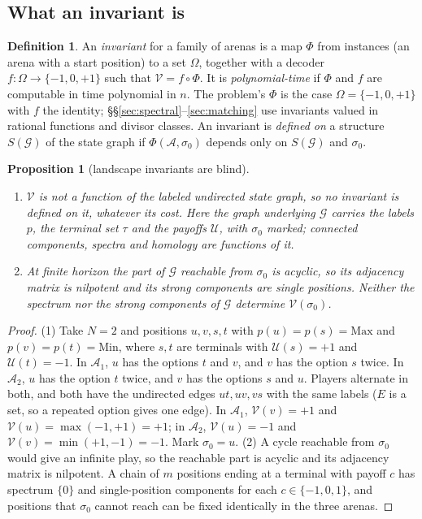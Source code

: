 \documentclass[11pt]{amsart}
\theoremstyle{plain}
\newtheorem{proposition}[theorem]{Proposition}
\theoremstyle{definition}
\newtheorem*{definition*}{Definition}
\theoremstyle{remark}
\numberwithin{equation}{section}
\newcommand{\val}{\mathcal{V}}            %
\newcommand{\pay}{\mathcal{U}}            %
\newcommand{\SG}{\mathcal{G}}             %
\newcommand{\arena}{\mathcal{A}}          %
\begin{document}
\subsection{What an invariant is}
\begin{definition*}
An \emph{invariant} for a family of arenas is a map $\Phi$ from instances (an arena with a start position) to a set $\Omega$, together with a decoder $f\colon\Omega\to\{-1,0,+1\}$ such that $\val=f\circ\Phi$. It is \emph{polynomial-time} if $\Phi$ and $f$ are computable in time polynomial in $n$. The problem's $\Phi$ is the case $\Omega=\{-1,0,+1\}$ with $f$ the identity; \S\S\ref{sec:spectral}--\ref{sec:matching} use invariants valued in rational functions and divisor classes. An invariant is \emph{defined on} a structure $S(\SG)$ of the state graph if $\Phi(\arena,\sigma_0)$ depends only on $S(\SG)$ and $\sigma_0$.
\end{definition*}

\begin{proposition}[landscape invariants are blind]\label{prop:blind}
\begin{enumerate}[label=\textup{(\arabic*)}]
\item $\val$ is not a function of the labeled undirected state graph, so no invariant is defined on it, whatever its cost. Here the graph underlying $\SG$ carries the labels $p$, the terminal set $\tau$ and the payoffs $\pay$, with $\sigma_0$ marked; connected components, spectra and homology are functions of it.
\item At finite horizon the part of $\SG$ reachable from $\sigma_0$ is acyclic, so its adjacency matrix is nilpotent and its strong components are single positions. Neither the spectrum nor the strong components of $\SG$ determine $\val(\sigma_0)$.
\end{enumerate}
\end{proposition}

\begin{proof}
(1) Take $N=2$ and positions $u,v,s,t$ with $p(u)=p(s)=\mathrm{Max}$ and $p(v)=p(t)=\mathrm{Min}$, where $s,t$ are terminals with $\pay(s)=+1$ and $\pay(t)=-1$. In $\arena_1$, $u$ has the options $t$ and $v$, and $v$ has the option $s$ twice. In $\arena_2$, $u$ has the option $t$ twice, and $v$ has the options $s$ and $u$. Players alternate in both, and both have the undirected edges $ut,uv,vs$ with the same labels ($E$ is a set, so a repeated option gives one edge). In $\arena_1$, $\val(v)=+1$ and $\val(u)=\max(-1,+1)=+1$; in $\arena_2$, $\val(u)=-1$ and $\val(v)=\min(+1,-1)=-1$. Mark $\sigma_0=u$.
(2) A cycle reachable from $\sigma_0$ would give an infinite play, so the reachable part is acyclic and its adjacency matrix is nilpotent. A chain of $m$ positions ending at a terminal with payoff $c$ has spectrum $\{0\}$ and single-position components for each $c\in\{-1,0,1\}$, and positions that $\sigma_0$ cannot reach can be fixed identically in the three arenas.
\end{proof}
\end{document}
